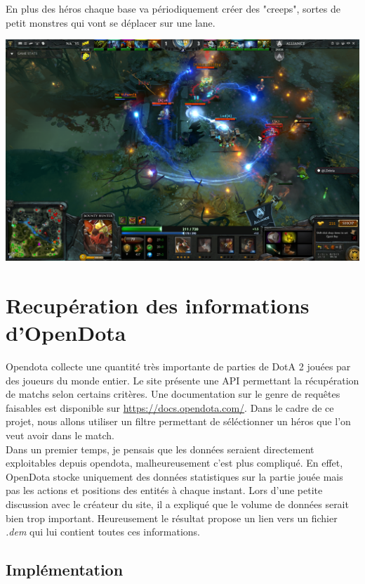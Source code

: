\documentclass{article}
\begin{document}
En plus des héros chaque base va périodiquement créer des "creeps", sortes de petit monstres qui vont se déplacer sur une lane.
\begin{center}
	\includegraphics[scale=0.25]{"dota2screen.png"} 
\end{center}

\section{Recupération des informations d'OpenDota}

Opendota collecte une quantité très importante de parties de DotA 2 jouées par des joueurs du monde entier. Le site présente une API permettant la récupération de matchs selon certains critères. Une documentation sur le genre de requêtes faisables est disponible sur \url{https://docs.opendota.com/}. Dans le cadre de ce projet, nous allons utiliser un filtre permettant de séléctionner un héros que l'on veut avoir dans le match.\\
Dans un premier temps, je pensais que les données seraient directement exploitables depuis opendota, malheureusement c'est plus compliqué. En effet, OpenDota stocke uniquement des données statistiques sur la partie jouée mais pas les actions et positions des entités à chaque instant. Lors d'une petite discussion avec le créateur du site, il a expliqué que le volume de données serait bien trop important. Heureusement le résultat propose un lien vers un fichier \textit{.dem} qui lui contient toutes ces informations.

\subsection{Implémentation}
\end{document}
